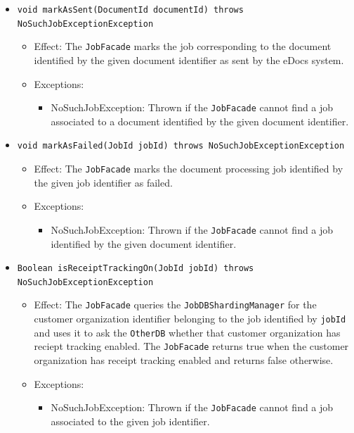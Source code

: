 \documentclass[a4paper,10pt]{article}
\begin{document}
\begin{itemize}
\begin{itemize}
     	\item \texttt{void markAsSent(DocumentId documentId) throws NoSuchJobExceptionException}
    	\begin{itemize}
    		\item Effect: The \texttt{JobFacade} marks the job corresponding to the document identified by the given document identifier as sent by the eDocs system.
    		\item Exceptions:
    		\begin{itemize}
    			\item NoSuchJobException: Thrown if the \texttt{JobFacade} cannot find a job associated to a document identified by the given document identifier.
    		\end{itemize}
    	\end{itemize}   	
  
  \item \texttt{void markAsFailed(JobId jobId) throws NoSuchJobExceptionException}
    	\begin{itemize}
    		\item Effect: The \texttt{JobFacade} marks the document processing job identified by the given job identifier as failed.
    		\item Exceptions:
    		\begin{itemize}
    			\item NoSuchJobException: Thrown if the \texttt{JobFacade} cannot find a job identified by the given document identifier.
    		\end{itemize}
    	\end{itemize}     	
    	
    	
    	\item \texttt{Boolean isReceiptTrackingOn(JobId jobId) throws NoSuchJobExceptionException}
    	\begin{itemize}
    		\item Effect: The \texttt{JobFacade} queries the \texttt{JobDBShardingManager} for the customer organization identifier belonging to the job identified by \texttt{jobId} and uses it to ask the \texttt{OtherDB} whether that customer organization has reciept tracking enabled. The \texttt{JobFacade} returns true when the customer organization has receipt tracking enabled and returns false otherwise.
    		\item Exceptions:
    		\begin{itemize}
    			\item NoSuchJobException: Thrown if the \texttt{JobFacade} cannot find a job associated to the given job identifier.
    		\end{itemize}
    	\end{itemize}
 	

\end{itemize}
\end{itemize}
\end{document}
